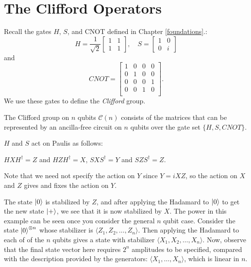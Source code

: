\documentclass[12pt]{dalthesis}
\begin{document}
\section{The Clifford Operators}
Recall the gates $H$, $S$, and CNOT defined in Chapter \ref{foundations}.:
  \[
  H = \frac{1}{\sqrt{2}} \begin{bmatrix}
  1 & 1 \\
  1 & 1
  \end{bmatrix}, \quad
  S = \begin{bmatrix}
  1 & 0 \\
  0 & i
  \end{bmatrix}
  \]
and 
  \[
  CNOT = \begin{bmatrix}
  1 & 0 & 0 & 0 \\
  0 & 1 & 0 & 0 \\
  0 & 0 & 0 & 1 \\
  0 & 0 & 1 & 0 \\
  \end{bmatrix}.
  \]
We use these gates to define the \emph{Clifford} group.

\begin{definition}
The Clifford group on $n$ qubits $\mathcal{C}(n)$ consists of the matrices that can be represented by an ancilla-free circuit on $n$ qubits over the gate set $\{H, S, CNOT\}$.
\end{definition}

\begin{proposition}
$H$ and $S$ act on Paulis as follows:
\begin{center}
$HXH^{\dag} = Z$ and $HZH^{\dag} = X$, $SXS^{\dag} = Y$ and $SZS^{\dag} = Z$.
\end{center}
Note that we need not specify the action on $Y$ since $Y = iXZ$, so the action on $X$ and $Z$ gives and fixes the action on $Y$.
\end{proposition}


The state $\ket{0}$ is stabilized by $Z$, and after applying the Hadamard to $\ket{0}$ to get the new state $\ket{+}$, we see that it is now stabilized by $X$. The power in this example can be seen once you consider the general $n$ qubit case. Consider the state $\ket{0}^{\otimes n}$ whose stabilizer is $\langle Z_1, Z_2, \dots , Z_n \rangle$. Then applying the Hadamard to each of of the $n$ qubits gives a state with stabilizer $\langle X_1 , X_2, \dots , X_n \rangle $. Now, observe that the final state vector here requires $2^n$ amplitudes to be specified, compared with the description provided by the generators: $\langle X_1, \dots , X_n \rangle$, which is linear in $n$. 
\end{document}

